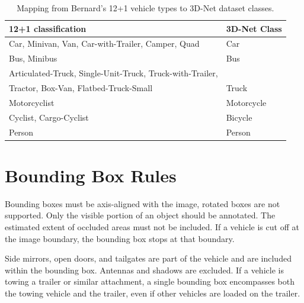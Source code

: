 \documentclass[12pt,oneside,bibtotoc,liststotoc]{scrbook}
\begin{document}
\begin{table}[H]
    \centering
    \scriptsize
    \caption{Mapping from Bernard's 12+1 vehicle types to 3D-Net dataset classes.}
    \label{tab:labeling_class_mapping}
    \begin{tabular}{|ll|}
        \toprule
        \rowcolor{white}
        \textbf{12+1 classification}                              & \textbf{3D-Net Class} \\
        \midrule
        Car, Minivan, Van, Car-with-Trailer, Camper, Quad         & Car                   \\
        Bus, Minibus                                              & Bus                   \\
        Articulated-Truck, Single-Unit-Truck, Truck-with-Trailer, &                       \\
        \quad Tractor, Box-Van, Flatbed-Truck-Small               & Truck                 \\
        Motorcyclist                                              & Motorcycle            \\
        Cyclist, Cargo-Cyclist                                    & Bicycle               \\
        Person                                                    & Person                \\
        \bottomrule
    \end{tabular}
\end{table}

\vspace{-2em}
\section{Bounding Box Rules}
\vspace{-0.5em}

Bounding boxes must be axis-aligned with the image, rotated boxes are not
supported. Only the visible portion of an object should be annotated. The
estimated extent of occluded areas must not be included. If a vehicle is
cut off at the image boundary, the bounding box stops at that boundary.

Side mirrors, open doors, and tailgates are part of the vehicle and are
included within the bounding box. Antennas and shadows are excluded.
If a vehicle is towing a trailer or similar attachment, a single bounding
box encompasses both the towing vehicle and the trailer, even if other
vehicles are loaded on the trailer.
\end{document}
